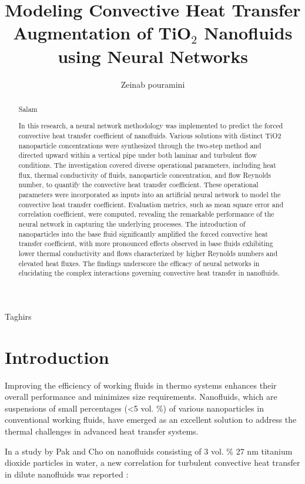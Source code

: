 \documentclass{article}
\title{Modeling Convective Heat Transfer Augmentation of TiO$_2$ Nanofluids using Neural Networks}
\author{Zeinab pouramini}
\date{}
\begin{document}
\maketitle

\begin{abstract}
	Salam
	
	
In this research, a neural network methodology was implemented to predict the forced convective heat transfer coefficient of nanofluids. Various solutions with distinct TiO2 nanoparticle concentrations were synthesized through the two-step method and directed upward within a vertical pipe under both laminar and turbulent flow conditions. The investigation covered diverse operational parameters, including heat flux, thermal conductivity of fluids, nanoparticle concentration, and flow Reynolds number, to quantify the convective heat transfer coefficient. These operational parameters were incorporated as inputs into an artificial neural network to model the convective heat transfer coefficient. Evaluation metrics, such as mean square error and correlation coefficient, were computed, revealing the remarkable performance of the neural network in capturing the underlying processes. The introduction of nanoparticles into the base fluid significantly amplified the forced convective heat transfer coefficient, with more pronounced effects observed in base fluids exhibiting lower thermal conductivity and flows characterized by higher Reynolds numbers and elevated heat fluxes. The findings underscore the efficacy of neural networks in elucidating the complex interactions governing convective heat transfer in nanofluids.
\end{abstract}


Taghirs

\section{Introduction}
Improving the efficiency of working fluids in thermo systems enhances their overall performance and minimizes size requirements. Nanofluids, which are suspensions of small percentages (<5 vol.  \%) of various nanoparticles in conventional working fluids, have emerged as an excellent solution to address the thermal challenges in advanced heat transfer systems.

In a study by Pak and Cho on nanofluids consisting of 3 vol.  \% 27 nm titanium dioxide particles in water, a new correlation for turbulent convective heat transfer in dilute nanofluids was reported \cite{ref1}:
\end{document}
